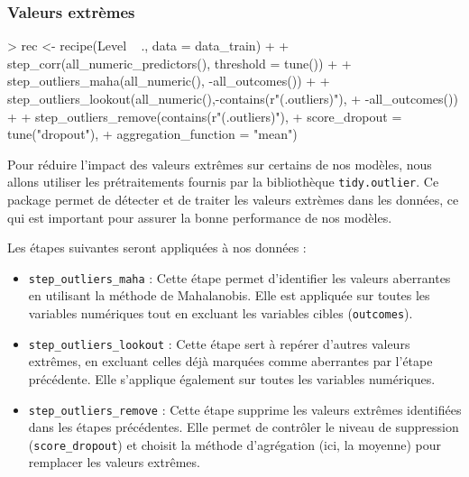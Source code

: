 \documentclass[a4paper,11pt]{article}
\begin{document}
\subsubsection{Valeurs extrèmes}

\begin{Schunk}
\begin{Sinput}
> rec <- recipe(Level ~ ., data = data_train)%>% 
+   
+   step_corr(all_numeric_predictors(), threshold = tune()) %>%
+   
+   step_outliers_maha(all_numeric(), -all_outcomes()) %>%
+   
+   step_outliers_lookout(all_numeric(),-contains(r"(.outliers)"),
+                         -all_outcomes()) %>% 
+   
+   step_outliers_remove(contains(r"(.outliers)"),
+                        score_dropout = tune("dropout"),
+                        aggregation_function = "mean")
\end{Sinput}
\end{Schunk}



Pour réduire l'impact des valeurs extrêmes sur certains de nos modèles, nous allons utiliser les prétraitements fournis par la bibliothèque \texttt{tidy.outlier}. Ce package permet de détecter et de traiter les valeurs extrèmes dans les données, ce qui est important pour assurer la bonne performance de nos modèles.

Les étapes suivantes seront appliquées à nos données :

\begin{itemize}
  \item \texttt{step\_outliers\_maha} : Cette étape permet d’identifier les valeurs aberrantes en utilisant la méthode de Mahalanobis. Elle est appliquée sur toutes les variables numériques tout en excluant les variables cibles (\texttt{outcomes}).
  
  \item \texttt{step\_outliers\_lookout} : Cette étape sert à repérer d'autres valeurs extrêmes, en excluant celles déjà marquées comme aberrantes par l'étape précédente. Elle s’applique également sur toutes les variables numériques.
  
  \item \texttt{step\_outliers\_remove} : Cette étape supprime les valeurs extrêmes identifiées dans les étapes précédentes. Elle permet de contrôler le niveau de suppression (\texttt{score\_dropout}) et choisit la méthode d’agrégation (ici, la moyenne) pour remplacer les valeurs extrêmes.
  
\end{itemize}
\end{document}
